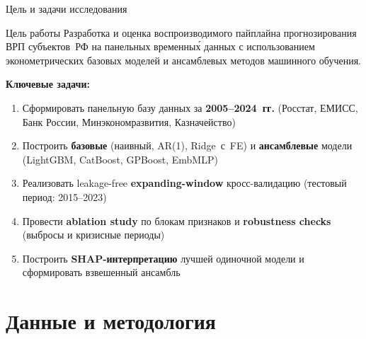 \documentclass[aspectratio=169,12pt]{beamer}
\begin{document}
\begin{frame}{Цель и задачи исследования}
\begin{block}{Цель работы}
  Разработка и оценка воспроизводимого пайплайна прогнозирования ВРП
  субъектов~РФ на панельных временны\'{х} данных с использованием
  эконометрических базовых моделей и ансамблевых методов машинного обучения.
\end{block}
\vspace{0.5em}
\textbf{\color{hsedark}Ключевые задачи:}
\begin{enumerate}
  \item Сформировать панельную базу данных за \textbf{2005–2024~гг.}
        (Росстат, ЕМИСС, Банк России, Минэкономразвития, Казначейство)
  \item Построить \textbf{базовые} (наивный, AR(1), Ridge~с~FE) и
        \textbf{ансамблевые} модели (LightGBM, CatBoost, GPBoost, EmbMLP)
  \item Реализовать leakage-free \textbf{expanding-window} кросс-валидацию
        (тестовый период: 2015–2023)
  \item Провести \textbf{ablation study} по блокам признаков и
        \textbf{robustness checks} (выбросы и кризисные периоды)
  \item Построить \textbf{SHAP-интерпретацию} лучшей одиночной модели
        и сформировать взвешенный ансамбль
\end{enumerate}
\end{frame}

\section{Данные и методология}
\end{document}
